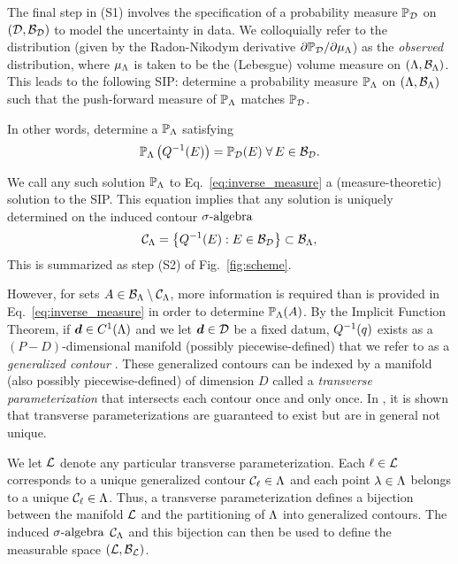 The final step in (S1) involves the specification of a probability measure $\mathbb{P}_{\mathcal{D}}$ on ${(\mathcal{D}, \mathcal{B}_{\mathcal{D}})}$ to model the uncertainty in data. 
We colloquially refer to the distribution (given by the Radon-Nikodym derivative $\partial \mathbb{P}_{\mathcal{D}} / \partial \mu_{{\Lambda}}$) as the \emph{observed} distribution, where $\mu_{{\Lambda}}$ is taken to be the (Lebesgue) volume measure on ${({\Lambda}, \mathcal{B}_{{\Lambda}})}$. 
This leads to the following SIP: determine a probability measure $\mathbb{P}_{\Lambda}$ on ${({\Lambda}, \mathcal{B}_{{\Lambda}})}$ such that the push-forward measure of $\mathbb{P}_{\Lambda}$ matches $\mathbb{P}_{\mathcal{D}}$. 

In other words, determine a $\mathbb{P}_{\Lambda}$ satisfying
\begin{equation}\label{eq:inverse_measure}
\mathbb{P}_{\Lambda} \left ( Q^{-1}(E)\right ) = \mathbb{P}_{\mathcal{D}}(E) \; \forall \, E \in \mathcal{B}_{\mathcal{D}}.
\end{equation}

We call any such solution $\mathbb{P}_{\Lambda}$ to Eq.~\eqref{eq:inverse_measure} a (measure-theoretic) solution to the SIP.
This equation implies that any solution is uniquely determined on the induced contour $\sigma\text{-algebra}$ 
\begin{equation}\label{eq:contour_sa}
\mathcal{C}_{\Lambda} = \left\{Q^{-1}(E) : E \in \mathcal{B}_{\mathcal{D}} \right\} \subset \mathcal{B}_{{\Lambda}},
\end{equation}
This is summarized as step (S2) of Fig.~\ref{fig:scheme}. 

However, for sets $A \in \mathcal{B}_{{\Lambda}} \setminus \mathcal{C}_{\Lambda}$, more information is required than is provided in Eq.~\eqref{eq:inverse_measure} in order to determine $\mathbb{P}_{\Lambda} (A)$. 
By the Implicit Function Theorem, if $\operatorname*{\boldsymbol{d}} \in C^1 ({\Lambda})$ and we let $\operatorname*{\boldsymbol{d}}\in\mathcal{D}$ be a fixed datum, $Q^{-1}(q)$ exists as a $(P-D)$\--dimensional manifold (possibly piecewise-defined) that we refer to as a \emph{generalized contour} \cite{BET+14}. 
These generalized contours can be indexed by a manifold (also possibly piecewise-defined) of dimension $D$ called a \emph{transverse parameterization} that intersects each contour once and only once. 
In \cite{BET+14}, it is shown that transverse parameterizations are guaranteed to exist but are in general not unique.

We let $\mathcal{L}$ denote any particular transverse parameterization. 
Each $\ell\in\mathcal{L}$ corresponds to a unique generalized contour $\mathcal{C}_\ell \in {\Lambda}$ and each point $\lambda\in{\Lambda}$ belongs to a unique $\mathcal{C}_\ell\in{\Lambda}$.
Thus, a transverse parameterization defines a bijection between the manifold $\mathcal{L}$ and the partitioning of ${\Lambda}$ into generalized contours. 
The induced $\sigma\text{-algebra}$ $\mathcal{C}_{\Lambda}$ and this bijection can then be used to define the measurable space $(\mathcal{L}, \mathcal{B}_{\mathcal{L}})$. 

